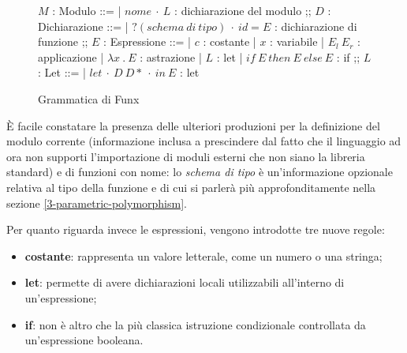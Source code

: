 \newpage

\begin{figure}[H]
    \centering
    \begin{spacedbnf}
        $M$ : \small{Modulo} ::=
        | $nome\ \cdot\ L$ : \small{dichiarazione del modulo}
        ;;
        $D$ : \small{Dichiarazione} ::=
        | $?(schema\ di\ tipo)\ \cdot\ id = E$ : \small{dichiarazione di funzione}
        ;;
        $E$ : \small{Espressione} ::=
        | $c$ : \small{costante}
        | $x$ : \small{variabile}
        | $E_l\ E_r$ : \small{applicazione}
        | $\lambda x\ .\ E$ : \small{astrazione}
        | $L$ : \small{let}
        | $if\ E\ then\ E\ else\ E$ : \small{if}
        ;;
        $L$ : \small{Let} ::=
        | $let\ \cdot\ D\ D*\ \cdot\ in\ E$ : \small{let}
    \end{spacedbnf}
    \caption{Grammatica di Funx}
    \label{fig:2-funx-syntax}
    \vspace{8mm}
\end{figure}

\noindent È facile constatare la presenza delle ulteriori produzioni per la definizione del modulo corrente
(informazione inclusa a prescindere dal fatto che il linguaggio ad ora non supporti l'importazione di moduli esterni
che non siano la libreria standard) e di funzioni con nome: lo \textit{schema di tipo} è un'informazione opzionale
relativa al tipo della funzione e di cui si parlerà più approfonditamente nella sezione \ref{3-parametric-polymorphism}.

\noindent Per quanto riguarda invece le espressioni, vengono introdotte tre nuove regole:
\begin{itemize}
    \item \textbf{costante}: rappresenta un valore letterale, come un numero o una stringa;
    \item \textbf{let}: permette di avere dichiarazioni locali utilizzabili all'interno di un'espressione;
    \item \textbf{if}: non è altro che la più classica istruzione condizionale controllata da un'espressione booleana.
\end{itemize}